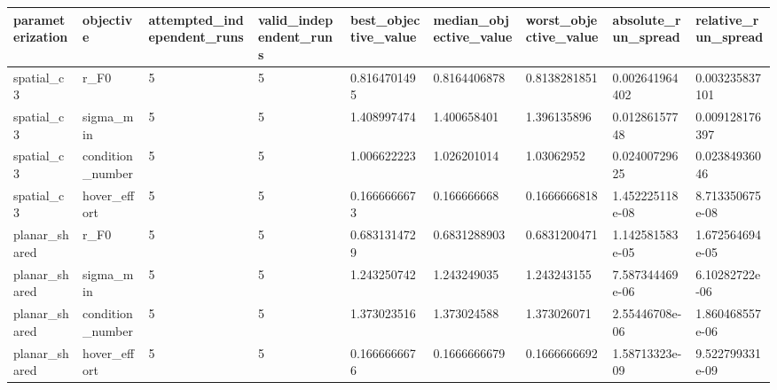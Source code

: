 \begin{tabular}{@{}lllllllll@{}}
\toprule
parameterization & objective & attempted\_independent\_runs & valid\_independent\_runs & best\_objective\_value & median\_objective\_value & worst\_objective\_value & absolute\_run\_spread & relative\_run\_spread \\
\midrule
spatial\_c3 & r\_F0 & 5 & 5 & 0.8164701495 & 0.8164406878 & 0.8138281851 & 0.002641964402 & 0.003235837101 \\
spatial\_c3 & sigma\_min & 5 & 5 & 1.408997474 & 1.400658401 & 1.396135896 & 0.01286157748 & 0.009128176397 \\
spatial\_c3 & condition\_number & 5 & 5 & 1.006622223 & 1.026201014 & 1.03062952 & 0.02400729625 & 0.02384936046 \\
spatial\_c3 & hover\_effort & 5 & 5 & 0.1666666673 & 0.166666668 & 0.1666666818 & 1.452225118e-08 & 8.713350675e-08 \\
planar\_shared & r\_F0 & 5 & 5 & 0.6831314729 & 0.6831288903 & 0.6831200471 & 1.142581583e-05 & 1.672564694e-05 \\
planar\_shared & sigma\_min & 5 & 5 & 1.243250742 & 1.243249035 & 1.243243155 & 7.587344469e-06 & 6.10282722e-06 \\
planar\_shared & condition\_number & 5 & 5 & 1.373023516 & 1.373024588 & 1.373026071 & 2.55446708e-06 & 1.860468557e-06 \\
planar\_shared & hover\_effort & 5 & 5 & 0.1666666676 & 0.1666666679 & 0.1666666692 & 1.58713323e-09 & 9.522799331e-09 \\
\bottomrule
\end{tabular}
